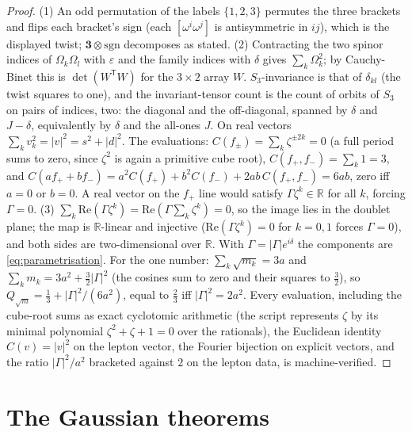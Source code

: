 \documentclass[11pt]{article}
\theoremstyle{definition}
\newcommand{\R}{\mathbb{R}}
\begin{document}
\begin{proof}
(1) An odd permutation of the labels $\{1,2,3\}$ permutes the three brackets and flips each bracket's sign (each $[\omega^{i}\omega^{j}]$ is antisymmetric in $ij$), which is the displayed twist; $\mathbf{3} \otimes \mathrm{sgn}$ decomposes as stated. (2) Contracting the two spinor indices of $\Omega_{k}\Omega_{l}$ with $\varepsilon$ and the family indices with $\delta$ gives $\sum_{k}\Omega_{k}^{2}$; by Cauchy-Binet this is $\det(W^{\mathsf{T}}W)$ for the $3 \times 2$ array $W$. $S_{3}$-invariance is that of $\delta_{kl}$ (the twist squares to one), and the invariant-tensor count is the count of orbits of $S_{3}$ on pairs of indices, two: the diagonal and the off-diagonal, spanned by $\delta$ and $J - \delta$, equivalently by $\delta$ and the all-ones $J$. On real vectors $\sum_{k}v_{k}^{2} = |v|^{2} = s^{2} + |d|^{2}$. The evaluations: $C(f_{\pm}) = \sum_{k}\zeta^{\pm 2k} = 0$ (a full period sums to zero, since $\zeta^{2}$ is again a primitive cube root), $C(f_{+}, f_{-}) = \sum_{k}1 = 3$, and $C(af_{+} + bf_{-}) = a^{2}C(f_{+}) + b^{2}C(f_{-}) + 2ab\,C(f_{+}, f_{-}) = 6ab$, zero iff $a = 0$ or $b = 0$. A real vector on the $f_{+}$ line would satisfy $\Gamma\zeta^{k} \in \R$ for all $k$, forcing $\Gamma = 0$. (3) $\sum_{k}\mathrm{Re}(\Gamma\zeta^{k}) = \mathrm{Re}(\Gamma\sum_{k}\zeta^{k}) = 0$, so the image lies in the doublet plane; the map is $\R$-linear and injective ($\mathrm{Re}(\Gamma\zeta^{k}) = 0$ for $k = 0, 1$ forces $\Gamma = 0$), and both sides are two-dimensional over $\R$. With $\Gamma = |\Gamma|e^{i\delta}$ the components are \eqref{eq:parametrisation}. For the one number: $\sum_{k}\sqrt{m_{k}} = 3a$ and $\sum_{k}m_{k} = 3a^{2} + \tfrac32|\Gamma|^{2}$ (the cosines sum to zero and their squares to $\tfrac32$), so $Q_{\sqrt{m}} = \tfrac13 + |\Gamma|^{2}/(6a^{2})$, equal to $\tfrac23$ iff $|\Gamma|^{2} = 2a^{2}$. Every evaluation, including the cube-root sums as exact cyclotomic arithmetic (the script represents $\zeta$ by its minimal polynomial $\zeta^{2} + \zeta + 1 = 0$ over the rationals), the Euclidean identity $C(v) = |v|^{2}$ on the lepton vector, the Fourier bijection on explicit vectors, and the ratio $|\Gamma|^{2}/a^{2}$ bracketed against $2$ on the lepton data, is machine-verified.
\end{proof}

\section{The Gaussian theorems}\label{sec:gaussian}
\end{document}
